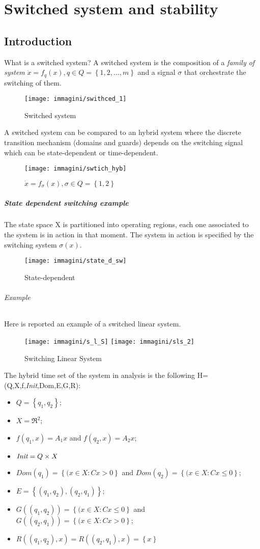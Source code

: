 \chapter{Switched system and stability}
\section{Introduction}
What is a switched system? A switched system is the composition of a \emph{family of system} $\dot{x}=f_q(x), q \in Q=\left\{1,2,\dots,m\right\}$ and a signal $\sigma$ that orchestrate the switching of them.\\
\begin{figure}[H]
	\centering
	\texttt{[image: immagini/swithced\_1]}
	\caption{Switched system}
	\label{fig:swithced1}
\end{figure}
A switched system can be compared to an hybrid system where the discrete transition mechanism (domains and guards) depends on the switching signal which can be state-dependent or time-dependent.
\begin{figure}[H]
	\centering
	\texttt{[image: immagini/swtich\_hyb]}
	\caption{$\dot{x}=f_{\sigma}(x), \sigma \in Q=\left\{1,2\right\}$}
	\label{fig:swtichhyb}
\end{figure}
\paragraph{State dependent switching example} The state space X is partitioned into operating regions, each one associated to the system is in action in that moment.  The system in action is specified by the switching system $\sigma(x)$.
\begin{figure}[H]
	\centering
	\texttt{[image: immagini/state\_d\_sw]}
	\caption{State-dependent}
	\label{fig:statedsw}
\end{figure}
\subparagraph{Example} Here is reported an example of a switched linear system.
\begin{figure}[H]
	\centering
	\texttt{[image: immagini/s\_l\_S]}
	\texttt{[image: immagini/sls\_2]}
	\caption{Switching Linear System}
	\label{fig:sls2}
\end{figure}
The hybrid time set of the system in analysis is the following H=(Q,X,f,\textit{Init},Dom,E,G,R):
\begin{itemize}
	\item $Q=\left\{q_1,q_2\right\}$;
	\item $X=\Re^2$;
	\item $f(q_1,x)=A_1x$ and $f(q_2,x)=A_2x$; 
	\item $\emph{Init}=Q \times X$ 
	\item $Dom(q_1)=\left\{(x\in X\colon Cx>0\right\} $ and $Dom(q_2)=\left\{(x\in X\colon Cx\le0\right\} $;
	\item $E=\left\{(q_1,q_2),(q_2,q_1)\right\}$;
	\item$G((q_1,q_2))=\left\{(x\in X\colon Cx\le0\right\} $ and $G((q_2,q_1))=\left\{(x\in X\colon Cx>0\right\} $;
	\item$R((q_1,q_2),x)=R((q_2,q_1),x)=\left\{x \right\}$
\end{itemize}
